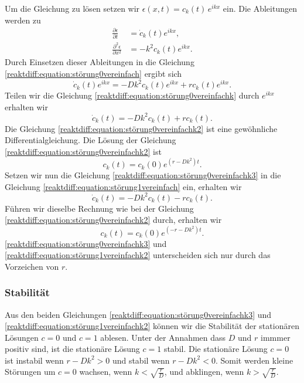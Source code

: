 Um die Gleichung zu lösen setzen wir \(\epsilon(x,t) = c_k(t)\, e^{ikx}\) ein.
Die Ableitungen werden zu
\begin{align*}
\frac{\partial \epsilon}{\partial t} &= \dot{c}_k(t) e^{ikx},\\
\frac{\partial^2 \epsilon}{\partial x^2} &= -k^2 c_k(t) e^{ikx}.
\end{align*}
Durch Einsetzen dieser Ableitungen in die Gleichung \eqref{reaktdiff:equation:störung0vereinfach} ergibt sich
\begin{equation}
\label{reaktdiff:equation:störung0vereinfachk}
\dot{c}_k(t) e^{ikx} = -D k^2 c_k(t) e^{ikx} + r c_k(t) e^{ikx}.
\end{equation}
Teilen wir die Gleichung \eqref{reaktdiff:equation:störung0vereinfachk} durch \(e^{ikx}\) erhalten wir
\begin{equation}
\label{reaktdiff:equation:störung0vereinfachk2}
\dot{c}_k(t) = -D k^2 c_k(t) + r c_k(t).
\end{equation}
Die Gleichung \eqref{reaktdiff:equation:störung0vereinfachk2} ist eine gewöhnliche Differentialgleichung.
Die Lösung der Gleichung \eqref{reaktdiff:equation:störung0vereinfachk2} ist
\begin{equation}
\label{reaktdiff:equation:störung0vereinfachk3}
c_k(t) = c_k(0) e^{(r - D k^2)t}.
\end{equation}
Setzen wir nun die Gleichung \eqref{reaktdiff:equation:störung0vereinfachk3} in die Gleichung \eqref{reaktdiff:equation:störung1vereinfach} ein, erhalten wir
\begin{equation}
\label{reaktdiff:equation:störung1vereinfachk}
\dot{c}_k(t) = -D k^2 c_k(t) - r c_k(t).
\end{equation}
Führen wir dieselbe Rechnung wie bei der 
Gleichung \eqref{reaktdiff:equation:störung0vereinfachk2} durch, erhalten wir
\begin{equation}
\label{reaktdiff:equation:störung1vereinfachk2}
c_k(t) = c_k(0) e^{(-r - D k^2)t}.
\end{equation}
\eqref{reaktdiff:equation:störung0vereinfachk3} und \eqref{reaktdiff:equation:störung1vereinfachk2} unterscheiden sich nur durch das Vorzeichen von \(r\).

\subsubsection{Stabilität}
Aus den beiden Gleichungen \eqref{reaktdiff:equation:störung0vereinfachk3} und \eqref{reaktdiff:equation:störung1vereinfachk2} können wir die Stabilität der stationären Lösungen \(c = 0\) und \(c = 1\) ablesen.
Unter der Annahmen dass \(D\) und \(r\) immmer positiv sind, ist die stationäre Lösung \(c = 1\) stabil.
Die stationäre Lösung \(c = 0\) ist instabil wenn \(r-Dk^2 > 0\) und stabil wenn \(r-Dk^2 < 0\).
Somit werden kleine Störungen um \(c = 0\) wachsen, wenn \(k < \sqrt{\frac{r}{D}}\), und abklingen, wenn \(k > \sqrt{\frac{r}{D}}\).

